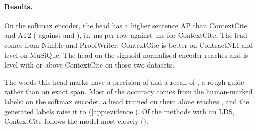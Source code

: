 \begin{table}[t]
  \centering\small
  \setlength{\tabcolsep}{4pt}
  \caption{Sentence evidence on the test rows with gold evidence. Sentence AP: average precision
  against the gold sentences, over all rows and per dataset (CNLI: ContractNLI, PW: ProofWriter). Top-1: share of rows
  where the top sentence is gold. LDS: how closely the scores follow the model's response to removed sentences; not evaluated for the heads. The first
  three methods and the first head use the encoder trained with the softmax. Each head is one training run. Bold: best in each column (lowest for time).}
  \label{tab:citation}
  
\end{table}

\paragraph{Results.}
On the softmax encoder, the head has a higher sentence AP than ContextCite and AT2 (\EvSentAPList{} against \ContextCiteSentAP{} and \AtTwoSentAP{}), in \EvMsList{}\,ms per row against \ContextCiteMs{}\,ms for ContextCite.
The lead comes from Nimble and ProofWriter; ContextCite is better on ContractNLI and level on MuSiQue.
The head on the sigmoid-normalised encoder reaches \EvSentAPSig{} and is level with or above ContextCite on those two datasets.

The words this head marks have a precision of \EvWordPSig{} and a recall of \EvWordRSig{}, a rough guide rather than an exact span.
Most of the accuracy comes from the human-marked labels: on the softmax encoder, a head trained on them alone reaches \EvSentAPGold{}, and the generated labels raise it to \EvSentAPList{} (\cref{app:evidence}).
Of the methods with an LDS, ContextCite follows the model most closely (\ContextCiteLds{}).
